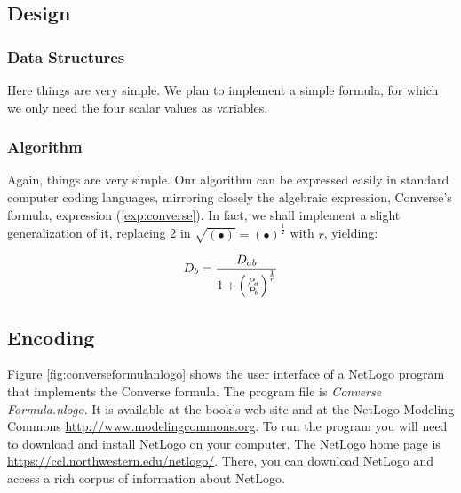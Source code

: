\subsection{Design}

\subsubsection{Data Structures}

Here things are very simple. We plan to implement a simple formula, for which we only need the four scalar values as variables.

\subsubsection{Algorithm}

Again, things are very simple. Our algorithm can be expressed easily in standard computer coding languages, mirroring closely the algebraic expression, Converse's formula, expression (\ref{exp:converse}). In fact, we shall implement a slight generalization of it, replacing 2 in $\sqrt{(\bullet)} = (\bullet)^{\frac{1}{2}}$ with $r$, yielding:

\begin{equation}
D_b = \frac{D_{ab}}{1 + \left({\frac{P_a}{P_b}}\right)^{\frac{1}{r}}} \label{exp:converse_gen}\index{Converse's formula}
\end{equation}


\subsection{Encoding}

Figure \ref{fig:converseformulanlogo} shows the user interface of a NetLogo program that implements the Converse formula. The program file is {\it Converse Formula.nlogo}. It is available at the book's web site and at the NetLogo Modeling Commons 
 \url{http://www.modelingcommons.org}.
 To run the program you will need to download and install NetLogo on your computer.
The NetLogo home page is \url{https://ccl.northwestern.edu/netlogo/}. There, you can download NetLogo and access a rich corpus of information about NetLogo.





